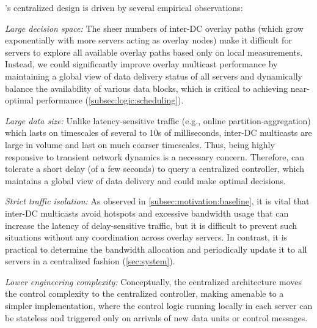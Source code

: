 \name's centralized design is driven by several empirical observations:
\begin{packedenumerate}

\item {\em Large decision space:}
The sheer numbers of inter-DC overlay paths
(which grow exponentially with more servers acting as overlay nodes)
make it difficult for servers to explore all available overlay
paths based only on local measurements.
Instead, we could significantly improve overlay multicast
performance by maintaining a global view of data delivery
status of all servers and dynamically balance
the availability of
various data blocks, which
is critical to achieving near-optimal performance
(\Section\ref{subsec:logic:scheduling}).

\item {\em Large data size:}
Unlike latency-sensitive traffic
(e.g., online partition-aggregation) which lasts on timescales
of several to 10s of milliseconds, inter-DC multicasts are large in volume and
last on much coarser timescales.
Thus, being highly responsive to transient network dynamics is a necessary concern.
Therefore, \name can tolerate a short delay (of a few seconds) to query a
centralized controller, which maintains a global view of data delivery
and could make optimal decisions.

\item {\em Strict traffic isolation:}
As observed in \Section\ref{subsec:motivation:baseline},
it is vital that inter-DC
multicasts avoid hotspots and excessive bandwidth usage that can increase the latency of delay-sensitive traffic,
but it is difficult to prevent such situations
without any coordination across overlay servers.
In contrast, it is practical
to determine the bandwidth allocation and periodically update it
to all servers in a centralized fashion (\Section\ref{sec:system}).

\item {\em Lower engineering complexity:}
Conceptually, the centralized architecture moves the control complexity to
the centralized controller, making \name amenable to a simpler implementation,
where the control logic running locally in each server can be stateless and
triggered only on arrivals of new data units or control messages.

\end{packedenumerate}

